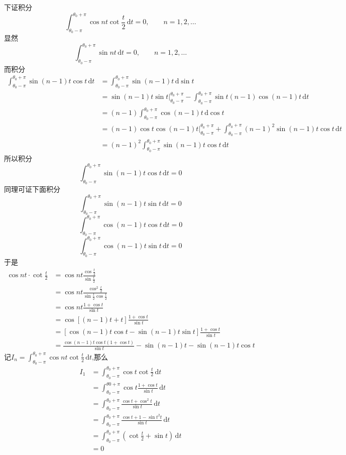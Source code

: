 下证积分
\[
  \int _{\theta_0-\pi}^{\theta_0+\pi} \cos nt \cot \frac{t}{2} \,\mathrm{d}t=0,\qquad n=1,2, \ldots 
\]
显然
\[
  \int _{\theta_0-\pi}^{\theta_0+\pi} \sin nt\,\mathrm{d}t=0,\qquad n=1,2, \ldots 
\]
而积分
\[
  \begin{split}
  \int _{\theta_0-\pi}^{\theta_0+\pi} \sin (n-1)t \cos t \,\mathrm{d}t 
  &=\int _{\theta_0-\pi}^{\theta_0+\pi} \sin (n-1)t \,\mathrm{d} \sin t\\  
  &=\sin (n-1)t \sin t\bigg| _{\theta_0-\pi}^{\theta_0+\pi}-
    \int _{\theta_0-\pi}^{\theta_0+\pi} \sin t (n-1) \cos (n-1)t \,\mathrm{d}t \\ 
  &=(n-1)\int _{\theta_0-\pi}^{\theta_0+\pi} \cos (n-1)t \,\mathrm{d} \cos t \\
  &=(n-1) \cos t \cos (n-1)t \bigg| _{\theta_0-\pi}^{\theta_0+\pi}+
    \int _{\theta_0-\pi}^{\theta_0+\pi} (n-1)^2 \sin (n-1)t \cos t \,\mathrm{d} t \\
  &=(n-1)^2\int _{\theta_0-\pi}^{\theta_0+\pi} \sin (n-1)t \cos t \,\mathrm{d}t
  \end{split}
\]
所以积分
\[
  \int _{\theta_0-\pi}^{\theta_0+\pi} \sin (n-1)t \cos t \,\mathrm{d}t =0
\]
同理可证下面积分
\[
  \int _{\theta_0-\pi}^{\theta_0+\pi} \sin (n-1)t \sin t \,\mathrm{d}t=0
\]
\[
  \int _{\theta_0-\pi}^{\theta_0+\pi} \cos (n-1)t \cos t \,\mathrm{d}t=0
\]
\[
  \int _{\theta_0-\pi}^{\theta_0+\pi} \cos (n-1)t \sin t \,\mathrm{d}t=0
\]
于是
\[
  \begin{split}
    \cos nt \cdot \cot \frac{t}{2}
    &=\cos nt \frac{\cos \frac{t}{2}}{\sin \frac{t}{2}}\\ 
    &=\cos nt \frac{\cos ^2 \frac{t}{2}}{\sin \frac{t}{2}\cos \frac{t}{2}}\\ 
    &=\cos nt \frac{1+\cos t }{\sin t}\\
    &=\cos [(n-1)t+t] \frac{1+\cos t }{\sin t }\\
    &=\left[\cos (n-1)t \cos t -\sin (n-1)t \sin t\right]\frac{1+\cos t }{\sin t}\\ 
    &=\frac{\cos (n-1)t \cos t (1+\cos t)}{\sin t}-\sin (n-1)t -\sin(n-1)t \cos  t
  \end{split}
\]
记$I_n=\int_{\theta_0-\pi}^{\theta_0+\pi} \cos nt \cot \frac{t}{2}\, \mathrm{d}t$,那么
\[
  \begin{split}  
    I_1&=\int _{\theta_0-\pi}^{\theta_0+\pi} \cos t \cot \frac{t}{2}\,\mathrm{d}t \\
       &=\int _{\theta_0-\pi}^{\theta0+\pi} \cos t \frac{1+\cos t}{\sin t}\,\mathrm{d}t \\ 
       &=\int _{\theta_0-\pi}^{\theta_0+\pi} \frac{\cos t +\cos ^2 t }{\sin t}\,\mathrm{d} t \\ 
       &=\int _{\theta_0-\pi}^{\theta_0+\pi} \frac{\cos t +1- \sin t ^2 t}{\sin t}\, \mathrm{d}t\\ 
       &=\int _{\theta_0-\pi}^{\theta_0+\pi} \left(\cot \frac{t}{2} +\sin t \right)\,\mathrm{d}t \\
       &=0
  \end{split}
\]

